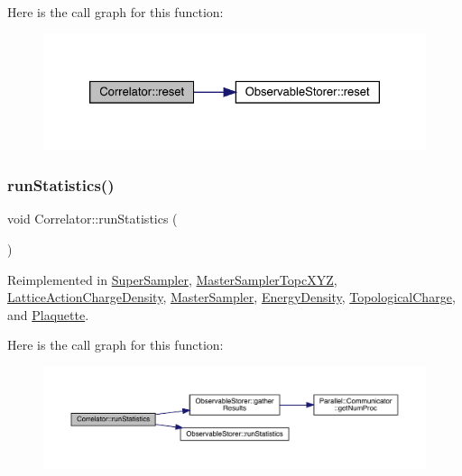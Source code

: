Here is the call graph for this function\+:\nopagebreak
\begin{figure}[H]
\begin{center}
\leavevmode
\includegraphics[width=326pt]{class_correlator_aacca40262d2cd62f0a3964e832f948c1_cgraph}
\end{center}
\end{figure}
\mbox{\label{class_correlator_a35197b1d12b62ef30b79c0138a26456e}} 
\subsubsection{\texorpdfstring{runStatistics()}{runStatistics()}}
{\footnotesize\ttfamily void Correlator\+::run\+Statistics (\begin{DoxyParamCaption}{ }\end{DoxyParamCaption})\hspace{0.3cm}{\ttfamily [virtual]}}



Reimplemented in \mbox{\hyperlink{class_super_sampler_af96f7d461e9159adb4eef9bda9c6ecde}{Super\+Sampler}}, \mbox{\hyperlink{class_master_sampler_topc_x_y_z_af748653ded9908f78383185475b9ddeb}{Master\+Sampler\+Topc\+X\+YZ}}, \mbox{\hyperlink{class_lattice_action_charge_density_a21d608703811d2814e7f654588eaa0c0}{Lattice\+Action\+Charge\+Density}}, \mbox{\hyperlink{class_master_sampler_ab7913d0dbdea57af3f469a3cdd74f8fc}{Master\+Sampler}}, \mbox{\hyperlink{class_energy_density_a584e164453ce880a45478c9b48ce2c4b}{Energy\+Density}}, \mbox{\hyperlink{class_topological_charge_ab9afadb9f37e638c0a168ebab5d41353}{Topological\+Charge}}, and \mbox{\hyperlink{class_plaquette_aa54bf1807d9b192048026f94d585fa4f}{Plaquette}}.

Here is the call graph for this function\+:\nopagebreak
\begin{figure}[H]
\begin{center}
\leavevmode
\includegraphics[width=350pt]{class_correlator_a35197b1d12b62ef30b79c0138a26456e_cgraph}
\end{center}
\end{figure}
\mbox{\label{class_correlator_adea33006fd850314004c320c258d9ec6}} 
